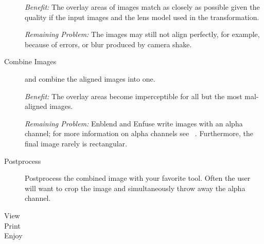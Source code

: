 \begin{description}
  \noindent\emph{Benefit:} The overlay areas of images match as closely as possible given the
  quality if the input images and the lens model used in the transformation.

  \noindent\emph{Remaining Problem:} The images may still not align perfectly, for example,
  because of  errors, or blur produced by camera shake.

\item[Combine Images]\itemend
  \App{} and \OtherApp{} combine the aligned images into one.

  \noindent\emph{Benefit:} The overlay areas become imperceptible for
  all but the most mal-aligned images.

  \noindent\emph{Remaining Problem:} Enblend and Enfuse write images with an alpha channel; for
  more information on alpha channels see \chapterName~.
  Furthermore, the final image rarely is rectangular.

\item[Postprocess]\itemend
  Postprocess the combined image with your favorite tool.  Often the user will want to crop the
  image and simultaneously throw away the alpha channel.

\item[View]

\item[Print]

\item[Enjoy]
\end{description}


